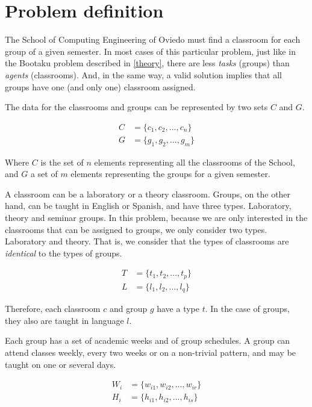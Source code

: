 \renewcommand{\documentname}{Problem definition}

\chapter{Problem definition}

The School of Computing Engineering of Oviedo must find a classroom for each group of a given semester. In most cases of this particular problem, just like in the Bootaku problem described in \ref{theory}, there are less \textit{tasks} (groups) than \textit{agents} (classrooms). And, in the same way, a valid solution implies that all groups have one (and only one) classroom assigned.

The data for the classrooms and groups can be represented by two sets $C$ and $G$. 

\begin{align}
    C &= \{ c_{1}, c_{2}, ..., c_{n} \}\\
    G &= \{ g_{1}, g_{2}, ..., g_{m} \}
\end{align}

Where $C$ is the set of $n$ elements representing all the classrooms of the School, and $G$ a set of $m$ elements representing the groups for a given semester.

A classroom can be a laboratory or a theory classroom. Groups, on the other hand, can be taught in English or Spanish, and have three types. Laboratory, theory and seminar groups. In this problem, because we are only interested in the classrooms that can be assigned to groups, we only consider two types. Laboratory and theory. That is, we consider that the types of classrooms are \textit{identical} to the types of groups.

\begin{align}
    T &= \{ t_{1}, t_{2}, ..., t_{p} \}\\
    L &= \{ l_{1}, l_{2}, ..., l_{q} \}
\end{align}

Therefore, each classroom $c$ and group $g$ have a type $t$. In the case of groups, they also are taught in language $l$.

Each group has a set of academic weeks and of group schedules. A group can attend classes weekly, every two weeks or on a non-trivial pattern, and may be taught on one or several days.

\begin{align}
    W_{i} &= \{ w_{i1}, w_{i2}, ..., w_{ir} \}\\
    H_{i} &= \{ h_{i1}, h_{i2}, ..., h_{is} \}
\end{align}

